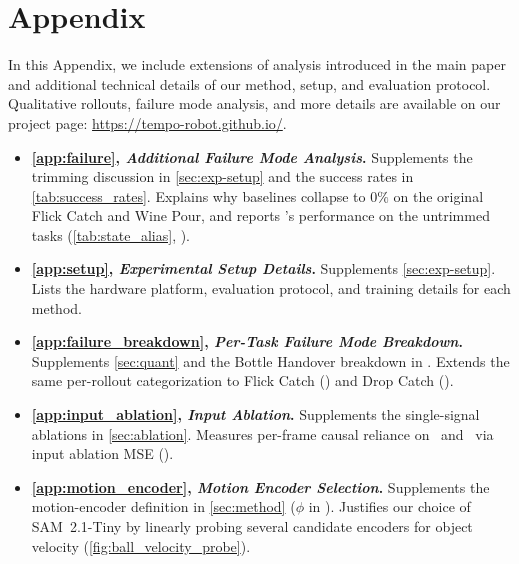 \clearpage
{}

\newpage
\appendix

\setcounter{figure}{0}
\setcounter{table}{0}
\renewcommand{\thefigure}{A\arabic{figure}}
\renewcommand{\thetable}{A\arabic{table}}

\section*{Appendix}

In this Appendix, we include extensions of analysis introduced in the main paper and additional technical details of our method, setup, and evaluation protocol. Qualitative rollouts, failure mode analysis, and more details are available on our project page: \url{https://tempo-robot.github.io/}.
\begin{itemize}
	\item \textbf{\cref{app:failure}, \emph{Additional Failure Mode Analysis}.} Supplements the trimming discussion in \cref{sec:exp-setup} and the success rates in \cref{tab:success_rates}. Explains why baselines collapse to $0\%$ on the original Flick Catch and Wine Pour, and reports \ours's performance on the untrimmed tasks (\cref{tab:state_alias}, ).
	\item \textbf{\cref{app:setup}, \emph{Experimental Setup Details}.} Supplements \cref{sec:exp-setup}. Lists the hardware platform, evaluation protocol, and training details for each method.
	\item \textbf{\cref{app:failure_breakdown}, \emph{Per-Task Failure Mode Breakdown}.} Supplements \cref{sec:quant} and the Bottle Handover breakdown in . Extends the same per-rollout categorization to Flick Catch () and Drop Catch ().
	\item \textbf{\cref{app:input_ablation}, \emph{Input Ablation}.} Supplements the single-signal ablations in \cref{sec:ablation}. Measures per-frame causal reliance on \TEMPOMOT\ and \TEMPOACT\ via input ablation MSE ().
	\item \textbf{\cref{app:motion_encoder}, \emph{Motion Encoder Selection}.} Supplements the motion-encoder definition in \cref{sec:method} ($\phi$ in \TEMPOMOT). Justifies our choice of SAM~2.1-Tiny by linearly probing several candidate encoders for object velocity (\cref{fig:ball_velocity_probe}).
\end{itemize}

